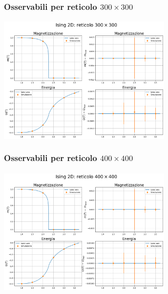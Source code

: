 \begin{frame}
    \frametitle{Osservabili per reticolo $300 \times 300$}
    \framesubtitle{}

    \centering
    \includegraphics[width=0.65\textwidth]{Immagini/backupIsing2D/obs_300.png}

\end{frame}



\begin{frame}
    \frametitle{Osservabili per reticolo $400 \times 400$}
    \framesubtitle{}

    \centering
    \includegraphics[width=0.65\textwidth]{Immagini/backupIsing2D/obs_400.png}

\end{frame}



